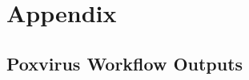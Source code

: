 \chapter*{Appendix}\label{chap:appendix}


\section*{Poxvirus Workflow Outputs}
\renewcommand{\arraystretch}{1.4}

